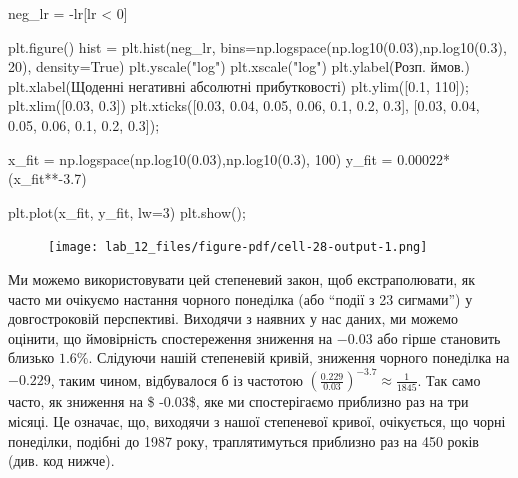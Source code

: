 \documentclass[
  letterpaper,
]{report}
\newenvironment{Shaded}{\begin{snugshade}}{\end{snugshade}}
\newcommand{\DecValTok}[1]{\textcolor[rgb]{0.68,0.00,0.00}{#1}}
\newcommand{\FloatTok}[1]{\textcolor[rgb]{0.68,0.00,0.00}{#1}}
\newcommand{\NormalTok}[1]{\textcolor[rgb]{0.00,0.23,0.31}{#1}}
\newcommand{\OperatorTok}[1]{\textcolor[rgb]{0.37,0.37,0.37}{#1}}
\newcommand{\StringTok}[1]{\textcolor[rgb]{0.13,0.47,0.30}{#1}}
\newcommand{\VariableTok}[1]{\textcolor[rgb]{0.07,0.07,0.07}{#1}}
\begin{document}
\begin{Shaded}
\begin{Highlighting}[]
\NormalTok{neg\_lr }\OperatorTok{=} \OperatorTok{{-}}\NormalTok{lr[lr }\OperatorTok{\textless{}} \DecValTok{0}\NormalTok{]}

\NormalTok{plt.figure()}
\NormalTok{hist }\OperatorTok{=}\NormalTok{ plt.hist(neg\_lr, bins}\OperatorTok{=}\NormalTok{np.logspace(np.log10(}\FloatTok{0.03}\NormalTok{),np.log10(}\FloatTok{0.3}\NormalTok{), }\DecValTok{20}\NormalTok{), density}\OperatorTok{=}\VariableTok{True}\NormalTok{)}
\NormalTok{plt.yscale(}\StringTok{"log"}\NormalTok{)}
\NormalTok{plt.xscale(}\StringTok{"log"}\NormalTok{)}
\NormalTok{plt.ylabel(}\StringTok{\textquotesingle{}Розп. ймов.\textquotesingle{}}\NormalTok{)}
\NormalTok{plt.xlabel(}\StringTok{\textquotesingle{}Щоденні негативні абсолютні прибутковості\textquotesingle{}}\NormalTok{)}
\NormalTok{plt.ylim([}\FloatTok{0.1}\NormalTok{, }\DecValTok{110}\NormalTok{])}\OperatorTok{;}
\NormalTok{plt.xlim([}\FloatTok{0.03}\NormalTok{, }\FloatTok{0.3}\NormalTok{])}
\NormalTok{plt.xticks([}\FloatTok{0.03}\NormalTok{, }\FloatTok{0.04}\NormalTok{, }\FloatTok{0.05}\NormalTok{, }\FloatTok{0.06}\NormalTok{, }\FloatTok{0.1}\NormalTok{, }\FloatTok{0.2}\NormalTok{, }\FloatTok{0.3}\NormalTok{], [}\FloatTok{0.03}\NormalTok{, }\FloatTok{0.04}\NormalTok{, }\FloatTok{0.05}\NormalTok{, }\FloatTok{0.06}\NormalTok{, }\FloatTok{0.1}\NormalTok{, }\FloatTok{0.2}\NormalTok{, }\FloatTok{0.3}\NormalTok{])}\OperatorTok{;}

\NormalTok{x\_fit }\OperatorTok{=}\NormalTok{ np.logspace(np.log10(}\FloatTok{0.03}\NormalTok{),np.log10(}\FloatTok{0.3}\NormalTok{), }\DecValTok{100}\NormalTok{)}
\NormalTok{y\_fit }\OperatorTok{=} \FloatTok{0.00022}\OperatorTok{*}\NormalTok{(x\_fit}\OperatorTok{**{-}}\FloatTok{3.7}\NormalTok{)}

\NormalTok{plt.plot(x\_fit, y\_fit, lw}\OperatorTok{=}\DecValTok{3}\NormalTok{)}
\NormalTok{plt.show()}\OperatorTok{;}
\end{Highlighting}
\end{Shaded}

\begin{figure}[H]

{\centering \texttt{[image: lab\_12\_files/figure-pdf/cell-28-output-1.png]}

}

\end{figure}

Ми можемо використовувати цей степеневий закон, щоб екстраполювати, як
часто ми очікуємо настання чорного понеділка (або ``події з 23
сигмами'') у довгостроковій перспективі. Виходячи з наявних у нас даних,
ми можемо оцінити, що ймовірність спостереження зниження на \(-0.03\)
або гірше становить близько \(1.6\%\). Слідуючи нашій степеневій кривій,
зниження чорного понеділка на \(-0.229\), таким чином, відбувалося б із
частотою
\(\left(\frac{0.229}{0.03}\right)^{-3.7} \approx \frac{1}{1845}\). Так
само часто, як зниження на \$ -0.03\$, яке ми спостерігаємо приблизно
раз на три місяці. Це означає, що, виходячи з нашої степеневої кривої,
очікується, що чорні понеділки, подібні до 1987 року, траплятимуться
приблизно раз на 450 років (див. код нижче).
\end{document}
